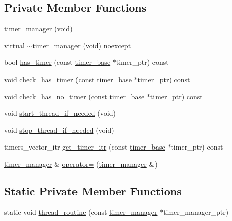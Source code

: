 \subsection*{Private Member Functions}
\begin{DoxyCompactItemize}
\item 
\hyperlink{classxstd_1_1chrono_1_1timer__manager_ab54140a0a3d1ababa9fb8953f556b8dc}{timer\-\_\-manager} (void)
\item 
virtual \hyperlink{classxstd_1_1chrono_1_1timer__manager_adeca1896ee815f70ed424dd884e94b65}{$\sim$timer\-\_\-manager} (void) noexcept
\item 
bool \hyperlink{classxstd_1_1chrono_1_1timer__manager_a88bb334bc67435a46b08a99dc2d45ed1}{has\-\_\-timer} (const \hyperlink{classxstd_1_1chrono_1_1timer__base}{timer\-\_\-base} $\ast$timer\-\_\-ptr) const 
\item 
void \hyperlink{classxstd_1_1chrono_1_1timer__manager_ac33f7326e60b3577bbf94c058e5f65d1}{check\-\_\-has\-\_\-timer} (const \hyperlink{classxstd_1_1chrono_1_1timer__base}{timer\-\_\-base} $\ast$timer\-\_\-ptr) const 
\item 
void \hyperlink{classxstd_1_1chrono_1_1timer__manager_a5e8e65bcefa980c1fe1dd4ee09007a84}{check\-\_\-has\-\_\-no\-\_\-timer} (const \hyperlink{classxstd_1_1chrono_1_1timer__base}{timer\-\_\-base} $\ast$timer\-\_\-ptr) const 
\item 
void \hyperlink{classxstd_1_1chrono_1_1timer__manager_a123733308516d62d9ba95012e407f4ec}{start\-\_\-thread\-\_\-if\-\_\-needed} (void)
\item 
void \hyperlink{classxstd_1_1chrono_1_1timer__manager_aaef36381eeb6f3ad92233636fdbb21c3}{stop\-\_\-thread\-\_\-if\-\_\-needed} (void)
\item 
timers\-\_\-vector\-\_\-itr \hyperlink{classxstd_1_1chrono_1_1timer__manager_a09e21fff24c5bb05da5f5559b80b3582}{get\-\_\-timer\-\_\-itr} (const \hyperlink{classxstd_1_1chrono_1_1timer__base}{timer\-\_\-base} $\ast$timer\-\_\-ptr) const 
\item 
\hyperlink{classxstd_1_1chrono_1_1timer__manager}{timer\-\_\-manager} \& \hyperlink{classxstd_1_1chrono_1_1timer__manager_a535934cf3cd6d1d700689c1f2f406f75}{operator=} (\hyperlink{classxstd_1_1chrono_1_1timer__manager}{timer\-\_\-manager} \&)
\end{DoxyCompactItemize}
\subsection*{Static Private Member Functions}
\begin{DoxyCompactItemize}
\item 
static void \hyperlink{classxstd_1_1chrono_1_1timer__manager_a8bb8b012bb6ec7cbc30b19d259668f0c}{thread\-\_\-routine} (const \hyperlink{classxstd_1_1chrono_1_1timer__manager}{timer\-\_\-manager} $\ast$timer\-\_\-manager\-\_\-ptr)
\end{DoxyCompactItemize}
